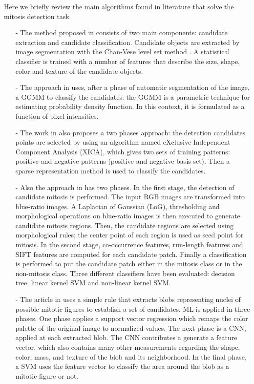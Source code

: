Here we briefly review the main algorithms found in literature that solve the mitosis detection task.

\begin{itemize}
 \item[-] The method proposed in \cite{Mitosis01} consists of two main components: candidate extraction and candidate classification.
Candidate objects are extracted by image segmentation with the Chan-Vese level set method \cite{moelich2003tracking}.
A statistical classifier is trained with a number of features that describe the size, shape, color and texture of the candidate objects.
 \item[-] The approach in \cite{mitosisDetectBreastCancer01} uses, after a phase of automatic segmentation of the image, a \Gls{GGMM} to classify
the candidates: the \Gls{GGMM} is a parametric technique for estimating probability density function. In this context, it is formulated as a function of pixel intensities.
 \item[-] The work in \cite{breastCancerMitosisPCA_ICA} also proposes a two phases approach: the detection candidates points are selected by using
an algorithm named eXclusive Independent Component Analysis (XICA), which gives two sets of training patterns: positive and negative patterns (positive and negative basis set).
Then a sparse representation method \cite{wright2009robust} is used to classify the candidates.
 \item[-] Also the approach in \cite{irshad2011automated} has two phases.
In the first stage, the detection of candidate mitosis is performed. The input RGB
images are transformed into blue-ratio images. A Laplacian of Gaussian (LoG), thresholding and morphological operations on blue-ratio images is then executed 
to generate candidate mitosis regions. Then, the candidate regions are selected using morphological rules; the center point of each region is used  as seed point for mitosis.
In the second stage, co-occurrence features, run-length features and SIFT features are computed for each candidate patch.
Finally a classification is performed to put the candidate patch either in the mitosis class or in the non-mitosis class.
Three different classifiers have been evaluated: decision tree, linear kernel \Gls{SVM} and non-linear kernel \Gls{SVM}.
 \item[-] The article in \cite{mitoticRecognition03Agreement} uses a simple rule that extracts blobs representing nuclei of possible mitotic figures to establish a set of
candidates. \Gls{ML} is applied in three phases. One phase applies a support vector regression which remaps the color palette of the original image to
normalized values. The next phase is a \Gls{CNN}, applied at each extracted blob. The \Gls{CNN} contributes a generate a feature vector, which also contains many other
measurements regarding the shape, color, mass, and texture of the blob and its neighborhood. In the final phase, a \Gls{SVM} uses the feature vector to
classify the area around the blob as a mitotic figure or not.
\end{itemize}


